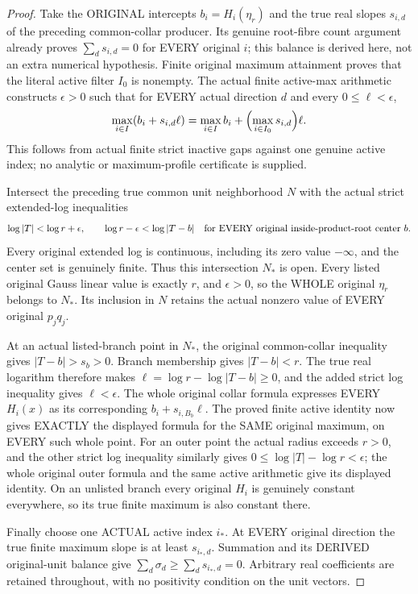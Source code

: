 \begin{proof}
Take the ORIGINAL intercepts $b_i=H_i(\eta_r)$ and the true real slopes
$s_{i,d}$ of the preceding common-collar producer. Its genuine root-fibre
count argument already proves $\sum_ds_{i,d}=0$ for EVERY original $i$;
this balance is derived here, not an extra numerical hypothesis.
Finite original maximum attainment proves that the literal active filter
$I_0$ is nonempty. The actual finite active-max arithmetic constructs
$\epsilon>0$ such that for EVERY actual direction $d$ and every
$0\le\ell<\epsilon$,
\[
 \max_{i\in I}(b_i+s_{i,d}\ell)
       =\max_{i\in I}b_i+
          \Bigl(\max_{i\in I_0}s_{i,d}\Bigr)\ell.
\]
This follows from actual finite strict inactive gaps against one genuine
active index; no analytic or maximum-profile certificate is supplied.

Intersect the preceding true common unit neighborhood $N$ with the actual
strict extended-log inequalities
\[
 \log|T|<\log r+\epsilon,\qquad
 \log r-\epsilon<\log|T-b|
       \quad\hbox{for EVERY original inside-product-root center }b.
\]
Every original extended log is continuous, including its zero value
$-\infty$, and the center set is genuinely finite. Thus this intersection
$N_*$ is open. Every listed original Gauss linear value is exactly $r$,
and $\epsilon>0$, so the WHOLE original $\eta_r$ belongs to $N_*$.
Its inclusion in $N$ retains the actual nonzero value of EVERY original
$p_jq_j$.

At an actual listed-branch point in $N_*$, the original common-collar
inequality gives $|T-b|>s_b>0$. Branch membership gives $|T-b|<r$.
The true real logarithm therefore makes
$\ell=\log r-\log|T-b|\ge0$, and the added strict log inequality gives
$\ell<\epsilon$. The whole original collar formula expresses EVERY
$H_i(x)$ as its corresponding $b_i+s_{i,B_b}\ell$. The proved finite
active identity now gives EXACTLY the displayed formula for the SAME
original maximum, on EVERY such whole point. For an outer point the
actual radius exceeds $r>0$, and the other strict log inequality similarly
gives $0\le\log|T|-\log r<\epsilon$; the whole original outer formula
and the same active arithmetic give its displayed identity. On an unlisted
branch every original $H_i$ is genuinely constant everywhere, so its true
finite maximum is also constant there.

Finally choose one ACTUAL active index $i_*$. At EVERY original direction
the true finite maximum slope is at least $s_{i_*,d}$. Summation and its
DERIVED original-unit balance give
$\sum_d\sigma_d\ge\sum_ds_{i_*,d}=0$. Arbitrary real coefficients are
retained throughout, with no positivity condition on the unit vectors.
\end{proof}

